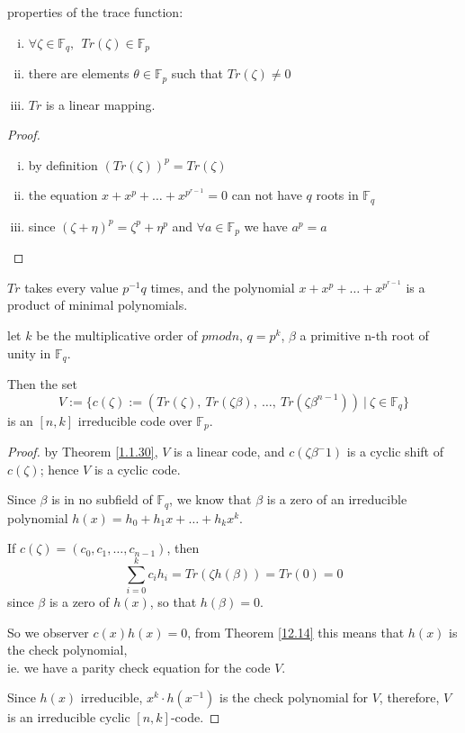 \documentclass{article}
\theoremstyle{definition}
\newenvironment{thm}[1]
{\renewcommand\theinnerthm{#1}\innerthm}
{\endinnerthm}
\newenvironment{cor}[1]
{\renewcommand\theinnercor{#1}\innercor}
{\endinnercor}
\begin{document}
\begin{thm}{1.1.30} \label{1.1.30}
  properties of the trace function:
  \begin{enumerate}[i.]
    \item $\forall \zeta \in \mathbb{F}_q, ~~ Tr(\zeta) \in \mathbb{F}_p$
    \item there are elements $\theta \in \mathbb{F}_p$ such that $Tr(\zeta) \neq 0$
    \item $Tr$ is a linear mapping.
  \end{enumerate}
\end{thm}
\begin{proof}
  \begin{enumerate}[i.]
    \item by definition $(Tr(\zeta))^p = Tr(\zeta)$
    \item the equation $x + x^p + \ldots + x^{p^{r-1}}=0$ can not have $q$ roots in $\mathbb{F}_q$
    \item since $(\zeta + \eta)^p = \zeta^p + \eta^p$ and $\forall a \in \mathbb{F}_p$ we have $a^p = a$
  \end{enumerate}
\end{proof}

\begin{cor}{}
  $Tr$ takes every value $p^{-1}q$ times, and the polynomial $x + x^p + \ldots + x^{p^{r-1}}$ is a product of minimal polynomials.
\end{cor}

\begin{thm}{6.5.1}
  let $k$ be the multiplicative order of $p mod n$, $q = p^k$, $\beta$ a primitive n-th root of unity in $\mathbb{F}_q$.

  Then the set
  $$V := \{ c(\zeta) := ( Tr(\zeta),~ Tr(\zeta \beta),~ \ldots,~ Tr(\zeta \beta^{n-1})) ~|~ \zeta \in \mathbb{F}_q \}$$
  is an $[n, k]$ irreducible code over $\mathbb{F}_p$.
\end{thm}
\begin{proof}
  by Theorem \ref{1.1.30}, $V$ is a linear code, and $c(\zeta \beta^-1)$ is a cyclic shift of $c(\zeta)$; hence $V$ is a cyclic code.

  Since $\beta$ is in no subfield of $\mathbb{F}_q$, we know that $\beta$ is a zero of an irreducible polynomial $h(x) = h_0 + h_1 x + \ldots + h_k x^k$.

  If $c(\zeta) = (c_0, c_1, \ldots, c_{n-1})$, then
  $$\sum_{i=0}^k c_i h_i = Tr(\zeta h(\beta)) = Tr(0) = 0$$
  since $\beta$ is a zero of $h(x)$, so that $h(\beta)=0$.


  So we observer $c(x) h(x) = 0$, from Theorem \ref{12.14} this means that $h(x)$ is the check polynomial,\\
  ie. we have a parity check equation for the code $V$.

  Since $h(x)$ irreducible, $x^k \cdot h(x^{-1})$ is the check polynomial for $V$, therefore, $V$ is an irreducible cyclic $[n, k]$-code.
\end{proof}
\end{document}
